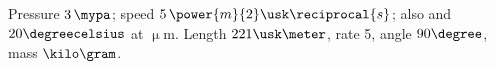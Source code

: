 \documentclass{article}
\begin{document}
Pressure $3\,\mypa$; speed $5\,\power{m}{2}\usk\reciprocal{s}$; also  and $20\degreecelsius$ at $\upmu$m.
Length $221\usk\meter$, rate \unit{5}{\metre\usk\reciprocal\second}, angle $90\degree$, mass $\kilo\gram$.
\end{document}

